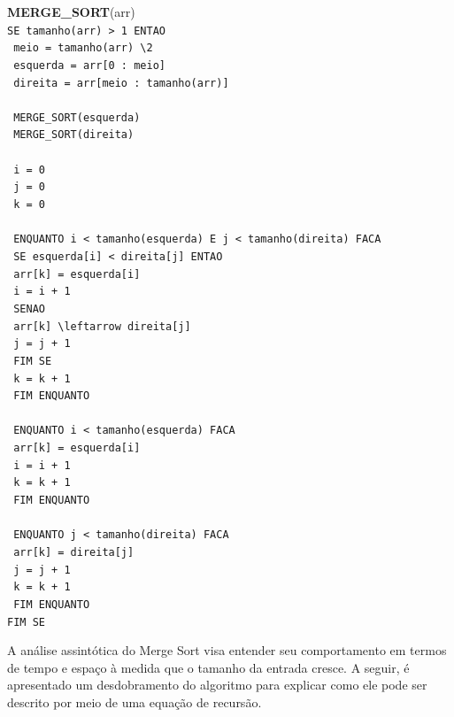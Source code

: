 \noindent
\textbf{MERGE\_SORT}(arr)\\
\texttt{SE tamanho(arr) > 1 ENTAO}\\
\texttt{    meio = tamanho(arr) \textbackslash 2}\\
\texttt{    esquerda = arr[0 : meio]}\\
\texttt{    direita = arr[meio : tamanho(arr)]}\\
\\
\texttt{    MERGE\_SORT(esquerda)}\\
\texttt{    MERGE\_SORT(direita)}\\
\\
\texttt{    i = 0}\\
\texttt{    j = 0}\\
\texttt{    k = 0}\\
\\
\texttt{    ENQUANTO i < tamanho(esquerda) E j < tamanho(direita) FACA}\\
\texttt{        SE esquerda[i] < direita[j] ENTAO}\\
\texttt{            arr[k] = esquerda[i]}\\
\texttt{            i = i + 1}\\
\texttt{        SENAO}\\
\texttt{            arr[k] \textbackslash leftarrow direita[j]}\\
\texttt{            j = j + 1}\\
\texttt{        FIM SE}\\
\texttt{        k = k + 1}\\
\texttt{    FIM ENQUANTO}\\
\\
\texttt{    ENQUANTO i < tamanho(esquerda) FACA}\\
\texttt{        arr[k] = esquerda[i]}\\
\texttt{        i = i + 1}\\
\texttt{        k = k + 1}\\
\texttt{    FIM ENQUANTO}\\
\\
\texttt{    ENQUANTO j < tamanho(direita) FACA}\\
\texttt{        arr[k] = direita[j]}\\
\texttt{        j = j + 1}\\
\texttt{        k = k + 1}\\
\texttt{    FIM ENQUANTO}\\
\texttt{FIM SE}

A análise assintótica do Merge Sort visa entender seu comportamento em termos de tempo e espaço à medida que o tamanho da entrada cresce. A seguir, é apresentado um desdobramento do algoritmo para explicar como ele pode ser descrito por meio de uma equação de recursão.


